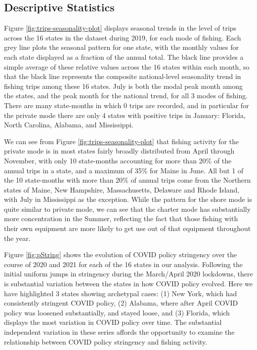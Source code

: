 \documentclass[12pt]{article}
\begin{document}
\subsection{Descriptive Statistics}



Figure \ref{fig:trips-seasonality-plot} displays seasonal trends in the
level of trips across the 16 states in the dataset during 2019, for each
mode of fishing. Each grey line plots the seasonal pattern for one
state, with the monthly values for each state displayed as a fraction of
the annual total. The black line provides a simple average of these
relative values across the 16 states within each month, so that the
black line represents the composite national-level seasonality trend in
fishing trips among these 16 states. July is both the modal peak month
among the states, and the peak month for the national trend, for all 3
modes of fishing. There are many state-months in which 0 trips are
recorded, and in particular for the private mode there are only 4 states
with positive trips in January: Florida, North Carolina, Alabama, and
Mississippi.

We can see from Figure \ref{fig:trips-seasonality-plot} that fishing
activity for the private mode is in most states fairly broadly
distributed from April through November, with only 10 state-months
accounting for more than 20\% of the annual trips in a state, and a
maximum of 35\% for Maine in June. All but 1 of the 10 state-months with
more than 20\% of annual trips come from the Northern states of Maine,
New Hampshire, Massachusetts, Delaware and Rhode Island, with July in
Mississippi as the exception. While the pattern for the shore mode is
quite similar to private mode, we can see that the charter mode has
substantially more concentration in the Summer, reflecting the fact that
those fishing with their own equipment are more likely to get use out of
that equipment throughout the year.



Figure \ref{fig:pString} shows the evolution of COVID policy stringency
over the course of 2020 and 2021 for each of the 16 states in our
analysis. Following the initial uniform jumps in stringency during the
March/April 2020 lockdowns, there is substantial variation between the
states in how COVID policy evolved. Here we have highlighted 3 states
showing archetypal cases: (1) New York, which had consistently stringent
COVID policy, (2) Alabama, where after April COVID policy was loosened
substantially, and stayed loose, and (3) Florida, which displays the
most variation in COVID policy over time. The substantial independent
variation in these series affords the opportunity to examine the
relationship between COVID policy stringency and fishing activity.
\end{document}
